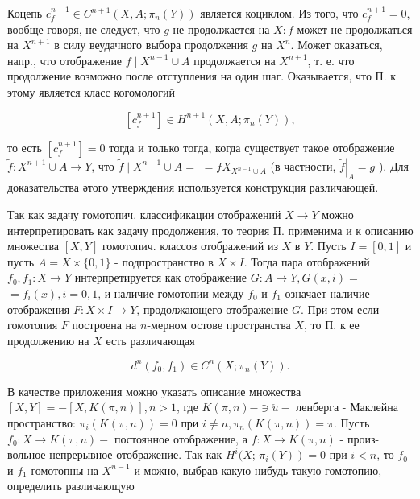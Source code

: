 \documentclass[10pt]{article}
\begin{document}
Коцепь $c_{f}^{n+1} \in C^{n+1}\left(X, A ; \pi_{n}(Y)\right)$ является коциклом. Из того, что $c_{f}^{n+1}=0$, вообще говоря, не следует, что $g$ не продолжается на $X: f$ может не продолжаться на $X^{n+1}$ в силу веудачного выбора продолжения $g$ на $X^{n}$. Может оказаться, напр., что отображение $f \mid X^{n-1} \cup A$ продолжается на $X^{n+1}$, т. е. что продолжение возможно после отступления на один шаг. Оказывается, что П. к этому является класс когомологий



\[

\left[c_{f}^{n+1}\right] \in H^{n+1}\left(X, A ; \pi_{n}(Y)\right),

\]



то есть $\left[c_{f}^{n+1}\right]=0$ тогда и только тогда, когда существует такое отображение $\tilde{f}: X^{n+1} \cup A \rightarrow Y$, что $\tilde{f} \mid X^{n-1} \cup A=$ $=f X_{X^{n-1} \cup A}$ (в частности, $\left.\tilde{f}\right|_{A}=g$ ). Для доказательства әтого утверждения используется конструкция различающей.



Так как задачу гомотопич. классификации отображений $X \rightarrow Y$ можно интерпретировать как задачу продолжения, то теория П. применима и к описанию множества $[X, Y]$ гомотопич. классов отображений из $X$ в $Y$. Пусть $I=[0,1]$ и пусть $A=X \times\{0,1\}$ - подпространство в $X \times I$. Тогда пара отображений $f_{0}, f_{1}: X \rightarrow Y$ интерпретируется как отображение $G: A \rightarrow Y, G(x, i)=$ $=f_{i}(x), i=0,1$, и наличие гомотопии между $f_{0}$ и $f_{1}$ означает наличие отображения $F: X \times I \rightarrow Y$, продолжающего отображение $G$. При этом если гомотопия $F$ построена на $n$-мерном остове пространства $X$, то П. к ее продолжению на $X$ есть различающая



\[

d^{n}\left(f_{0}, f_{1}\right) \in C^{n}\left(X ; \pi_{n}(Y)\right) .

\]



В качестве приложения можно указать описание множества $[X, Y]=-[X, K(\pi, n)], n>1$, где $K(\pi, n)-\ni \check{u}-$ ленберга - Маклейна пространство: $\pi_{i}(K(\pi, n))=0$ при $i \neq n, \pi_{n}(K(\pi, n))=\pi$. Пусть $f_{0}: X \rightarrow K(\pi, n)-$ постоянное отображение, а $f: X \rightarrow K(\pi, n)$ - произ- вольное непрерывное отображение. Так как $H^{i}(X$; $\left.\pi_{i}(Y)\right)=0$ при $i<n$, то $f_{0}$ и $f_{1}$ гомотопны на $X^{n-1}$ и можно, выбрав какую-нибудь такую гомотопию, определить различающую
\end{document}
